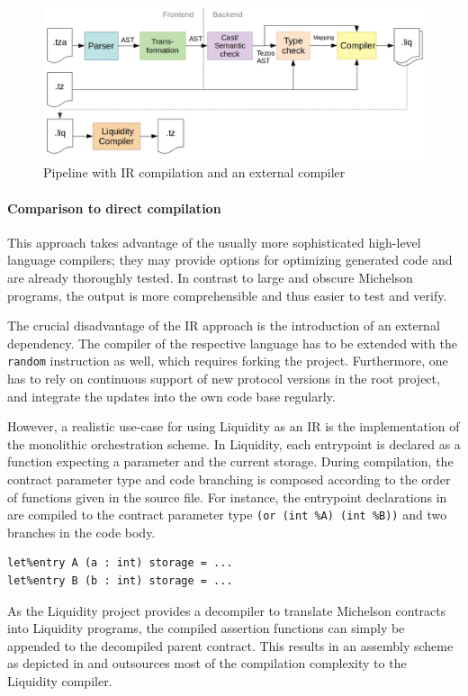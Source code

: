 \begin{figure}[h]
\centering
\includegraphics[width=\linewidth]{figures/5-offline_tezos/pipeline_liq}
\caption{Pipeline with IR compilation and an external compiler}
\label{fig:pipeline_liq}
\end{figure}

\paragraph{Comparison to direct compilation}
This approach takes advantage of the usually more sophisticated high-level language compilers; they may provide options for optimizing generated code and are already thoroughly tested. In contrast to large and obscure Michelson programs, the output is more comprehensible and thus easier to test and verify.

The crucial disadvantage of the IR approach is the introduction of an external dependency. The compiler of the respective language has to be extended with the \texttt{random} instruction as well, which requires forking the project. Furthermore, one has to rely on continuous support of new protocol versions in the root project, and integrate the updates into the own code base regularly.

However, a realistic use-case for using Liquidity as an IR is the implementation of the monolithic orchestration scheme. In Liquidity, each entrypoint is declared as a function expecting a parameter and the current storage. During compilation, the contract parameter type and code branching is composed according to the order of functions given in the source file. For instance, the entrypoint declarations in  are compiled to the contract parameter type \texttt{(or (int \%A) (int \%B))} and two branches in the code body.  
\begin{lstlisting}[numbers=none, label=lst:liq_eps, caption=Entrypoint declarations in Liquidity]
let%entry A (a : int) storage = ...
let%entry B (b : int) storage = ...
\end{lstlisting}
As the Liquidity project provides a decompiler to translate Michelson contracts into Liquidity programs, the compiled assertion functions can simply be appended to the decompiled parent contract. This results in an assembly scheme as depicted in  and outsources most of the compilation complexity to the Liquidity compiler.

